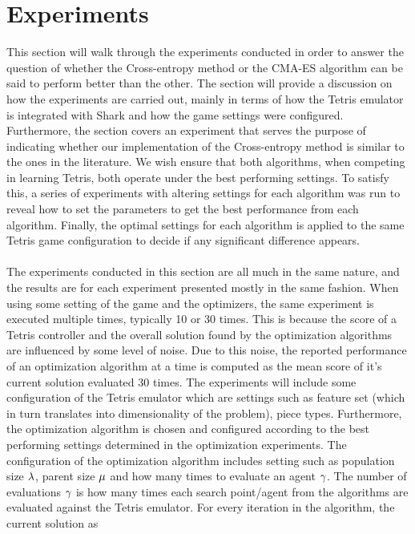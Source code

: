 \section{Experiments}
This section will walk through the experiments conducted in order to answer the question 
of whether the Cross-entropy method or the CMA-ES algorithm can be said to perform better
than the other. The section will provide a discussion on how the experiments are carried out, mainly
in terms of how the Tetris emulator is integrated with Shark and how the game settings were configured.
Furthermore, the section covers an experiment that serves the purpose of indicating whether our implementation
of the Cross-entropy method is similar to the ones in the literature. 
We wish ensure that both algorithms, when competing in learning Tetris, both operate under the 
best performing settings. To satisfy this, a series of experiments with altering settings for each 
algorithm was run to reveal how to set the parameters to get the best performance from 
each algorithm. Finally, the optimal settings for each algorithm is applied to
the same Tetris game configuration to decide if any significant difference appears.\\
\\
The experiments conducted in this section are all much in the same nature, and the 
results are for each experiment presented mostly in the same fashion. When using some setting 
of the game and the optimizers, the same experiment is executed multiple times, typically 
10 or 30 times. This is because the score of a Tetris controller and the overall 
solution found by the optimization algorithms are influenced by some level of noise.
Due to this noise, the reported performance of an optimization algorithm at a time
is computed as the mean score of it's current solution evaluated 30 times.
The experiments will include some configuration of the Tetris emulator which are settings
such as feature set (which in turn translates into dimensionality of the problem),
piece types. Furthermore, the optimization algorithm is chosen and configured according to
the best performing settings determined in the optimization experiments. The
configuration of the optimization algorithm includes setting such as population size
$\lambda$, parent size $\mu$ and how many times
to evaluate an agent $\gamma$. The number of evaluations $\gamma$
is how many times each search point/agent from the algorithms are evaluated against the 
Tetris emulator. For every iteration in the algorithm, the current solution as 
